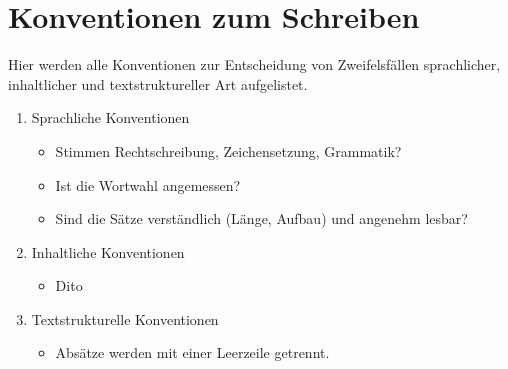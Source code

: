 \documentclass[pdftex,a4paper,12pt]{scrartcl}
\begin{document}
\section{Konventionen zum Schreiben}
Hier werden alle Konventionen zur Entscheidung von Zweifelsfällen sprachlicher, inhaltlicher und textstruktureller Art aufgelistet.
\begin{enumerate}
	\item Sprachliche Konventionen
	\begin{itemize}
	\item Stimmen Rechtschreibung, Zeichensetzung, Grammatik?
	\item Ist die Wortwahl angemessen?
	\item Sind die Sätze verständlich (Länge, Aufbau) und angenehm lesbar?
	\end{itemize}
	\item Inhaltliche Konventionen
	\begin{itemize}
	\item Dito
	\end{itemize}
	\item Textstrukturelle Konventionen
	\begin{itemize}
	\item Absätze werden mit einer Leerzeile getrennt.
	\end{itemize}
\end{enumerate}

	
	
\end{document}
